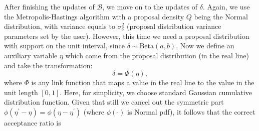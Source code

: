 \documentclass[a4paper]{article}
\begin{document}

After finishing the updates of $\mathcal{B}$, we move on to the updates of $\delta$. Again, we use the Metropolis-Hastings algorithm with a proposal density $Q$ being the Normal distribution, with variance equals to $\sigma^2_\delta$ (proposal distribution variance parameters set by the user). However, this time we need a proposal distribution with support on the unit interval, since $ \delta \sim \mbox{Beta}(a, b)$.  Now we define an auxiliary variable $\eta$ which come from the proposal distribution (in the real line) and take the transformation:
 $$\delta = \Phi(\eta),$$
 where $\Phi$ is any link function that maps a value in the real line to the value in the unit length $[0, 1]$. Here, for simplicity, we choose standard Gaussian cumulative distribution function. Given that still we cancel out the symmetric part $\phi(\eta^\prime-\eta) =\phi(\eta-\eta^\prime)$ (where $\phi(\cdot)$ is Normal pdf), it follows that the correct acceptance ratio is 
\end{document}
